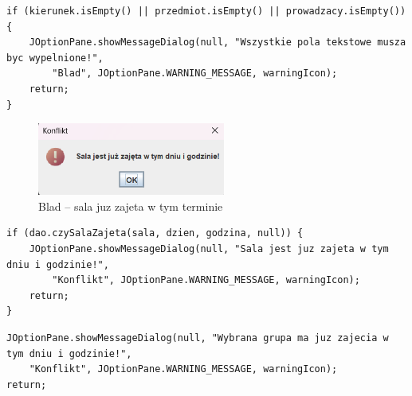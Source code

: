 \begin{lstlisting}[caption={Walidacja pustych pol}, label={lst:puste}]
if (kierunek.isEmpty() || przedmiot.isEmpty() || prowadzacy.isEmpty()) {
    JOptionPane.showMessageDialog(null, "Wszystkie pola tekstowe musza byc wypelnione!",
        "Blad", JOptionPane.WARNING_MESSAGE, warningIcon);
    return;
}
\end{lstlisting}

\begin{figure}[H]
\centering
\includegraphics[width=0.55\textwidth]{figures/Errors/sala_zajeta_error.png}
\caption{Blad – sala juz zajeta w tym terminie}
\end{figure}

\begin{lstlisting}[caption={Sprawdzanie dostepnosci sali}, label={lst:sala}]
if (dao.czySalaZajeta(sala, dzien, godzina, null)) {
    JOptionPane.showMessageDialog(null, "Sala jest juz zajeta w tym dniu i godzinie!",
        "Konflikt", JOptionPane.WARNING_MESSAGE, warningIcon);
    return;
}
\end{lstlisting}

\begin{lstlisting}[caption={Sprawdzenie konfliktu grupy}, label={lst:grupa}]
JOptionPane.showMessageDialog(null, "Wybrana grupa ma juz zajecia w tym dniu i godzinie!",
    "Konflikt", JOptionPane.WARNING_MESSAGE, warningIcon);
return;
\end{lstlisting}
